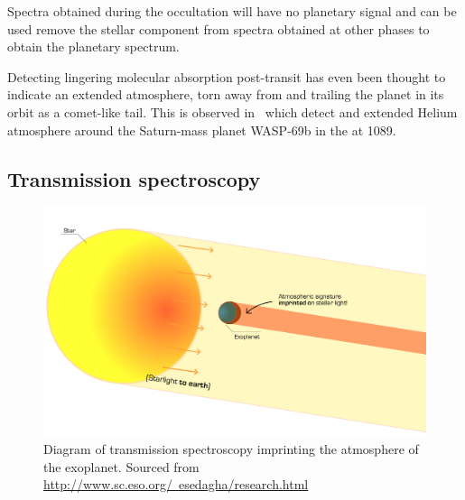 Spectra obtained during the occultation will have no planetary signal and can be used remove the stellar component from spectra obtained at other phases to obtain the planetary spectrum.

Detecting lingering molecular absorption post-transit has even been thought to indicate an extended atmosphere, torn away from and trailing the planet in its orbit as a comet-like tail.
This is observed in~\citet{nortmann_groundbased_2018} which detect and extended Helium atmosphere around the Saturn-mass planet {WASP-69}b in the \nir{} at 1089\nm{}.

\subsection{Transmission spectroscopy}
\label{subsec:transmission_spectroscopy}
\begin{figure}
    \centering
    \includegraphics[width=0.65\linewidth]{figures/introduction/transmission_spectroscopy}
    \caption[Transmission spectroscopy diagram.]{Diagram of transmission spectroscopy imprinting the atmosphere of the exoplanet.
    Sourced from \href{http://www.sc.eso.org/~esedagha/research.html}{http://www.sc.eso.org/~esedagha/research.html}}
    \label{fig:transmissionspectroscopy}
\end{figure}


